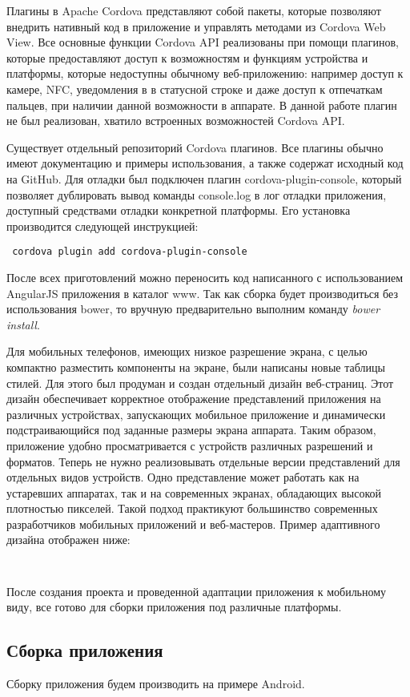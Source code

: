 Плагины в Apache Cordova представляют собой пакеты, которые позволяют внедрить нативный код в приложение и управлять методами из Cordova Web View. Все основные функции Cordova API реализованы при помощи плагинов, которые предоставляют доступ к возможностям и функциям устройства и платформы, которые недоступны обычному веб-приложению: например доступ к камере, NFC, уведомления в в статусной строке и даже доступ к отпечаткам пальцев, при наличии данной возможности в аппарате. В данной работе плагин не был реализован, хватило встроенных возможностей Cordova API.

Существует отдельный репозиторий Cordova плагинов. Все плагины обычно имеют документацию и примеры использования, а также содержат исходный код на GitHub. Для отладки был подключен плагин cordova-plugin-console, который позволяет дублировать вывод команды console.log в лог отладки приложения, доступный средствами отладки конкретной платформы. Его установка производится следующей инструкцией:
\begin{lstlisting}
 cordova plugin add cordova-plugin-console
\end{lstlisting}

После всех приготовлений можно переносить код написанного с использованием AngularJS приложения в каталог www. Так как сборка будет производиться без использования bower, то вручную предварительно выполним команду \textit{bower install}. 

Для мобильных телефонов, имеющих низкое разрешение экрана, с целью компактно разместить компоненты на экране, были написаны новые таблицы стилей. Для этого был продуман и создан отдельный дизайн веб-страниц. Этот дизайн обеспечивает корректное отображение представлений приложения на различных устройствах, запускающих мобильное приложение и динамически подстраивающийся под заданные размеры экрана аппарата. Таким образом, приложение удобно просматривается с устройств различных разрешений и форматов. Теперь не нужно реализовывать отдельные версии представлений для отдельных видов устройств. Одно представление может работать как на устаревших аппаратах, так и на современных экранах, обладающих высокой плотностью пикселей. Такой подход практикуют большинство современных разработчиков мобильных приложений и веб-мастеров. Пример адаптивного дизайна отображен ниже:
\begin{lstlisting}
 
\end{lstlisting}


После создания проекта и проведенной адаптации приложения к мобильному виду, все готово для сборки приложения под различные платформы.

\subsection{Сборка приложения}
Сборку приложения будем производить на примере Android. 